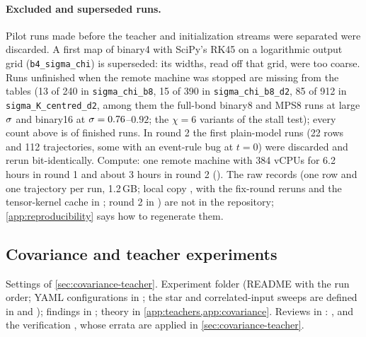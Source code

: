 \paragraph{Excluded and superseded runs.}
Pilot runs made before the teacher and initialization streams were separated were discarded. A first map of
binary4 with SciPy's RK45 on a logarithmic output grid (\texttt{b4\_sigma\_chi}) is superseded: its widths, read off
that grid, were too coarse. Runs unfinished when the remote machine was stopped are missing from the tables
(13 of 240 in \texttt{sigma\_chi\_b8}, 15 of 390 in \texttt{sigma\_chi\_b8\_d2}, 85 of 912 in
\texttt{sigma\_K\_centred\_d2}, among them the full-bond binary8 and MPS8 runs at large $\sigma$ and binary16 at
$\sigma=0.76$--$0.92$; the $\chi=6$ variants of the stall test); every count above is of finished runs. In round 2
the first plain-model runs (22 rows and 112 trajectories, some with an event-rule bug at $t=0$) were discarded
and rerun bit-identically. Compute: one remote machine with 384 vCPUs for 6.2 hours in round 1 and about 3 hours
in round 2 (). The raw records (one row and one trajectory per run, 1.2\,GB; local copy
, with the fix-round reruns and the tensor-kernel cache in ;
round 2 in ) are not in the repository; \cref{app:reproducibility} says how to regenerate
them.

\subsection{Covariance and teacher experiments}\label{app:exp-data-teacher}
Settings of \cref{sec:covariance-teacher}. Experiment folder  (README with
the run order; YAML configurations in ; the star and correlated-input sweeps are defined
in  and ); findings in ; theory in
\cref{app:teachers,app:covariance}. Reviews in : ,
 and the verification , whose errata are
applied in \cref{sec:covariance-teacher}.


